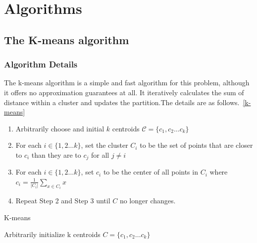 \documentclass[11pt]{article}
\begin{document}
\section{Algorithms}
\subsection{The K-means algorithm}
\subsubsection{Algorithm Details}
The k-means algorithm is a simple and fast algorithm for this problem, although it offers no approximation guarantees at all.
It iteratively calculates the sum of distance within a cluster and updates the partition.The details are as follows.~\ref{k-means}
\begin{enumerate}
  \item Arbitrarily choose and initial $k$ centroids $\mathcal{C} = \{c_1, c_2 \dots c_k\}$
  \item For each $i \in \{1, 2 \dots k\}$, set the cluster $C_i$ to be the set of points that are closer to $c_i$ than they are to $c_j$ for all $j \neq i$
  \item For each $i \in \{1, 2 \dots k\}$, set $c_i$ to be the center of all points in $C_i$ where $c_i = \frac{1}{\left\lvert C_i \right\rvert }\sum_{x \in C_i} x $
  \item Repeat Step 2 and Step 3 until $C$ no longer changes.
\end{enumerate}
\begin{algorithm}
  \caption{K-means}
  \label{k-means}
  \begin{algorithmic}
    \STATE Arbitrarily initialize k centroids $C=\{c_1, c_2 \dots c_k\}$ 
    \REPEAT
      \ENDFOR
      \ENDFOR
      \ENDFOR
      \ENDFOR
  \end{algorithmic}
\end{algorithm}
\end{document}
